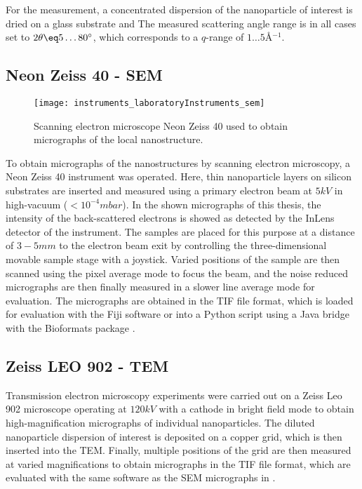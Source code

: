 \documentclass[\main/dresen_thesis.tex]{subfiles}
\begin{document}
    For the measurement, a concentrated dispersion of the nanoparticle of interest is dried on a glass substrate and
    The measured scattering angle range is in all cases set to $2 \theta \eq 5 \ldots 80^\circ$, which corresponds to a $q$-range of $1 \ldots 5 \unit{\angstrom^{-1}}$.


  \subsection{Neon Zeiss 40 - SEM}
    \label{ch:instruments:laboratoryInstruments:sem}
    \begin{figure}[ht]
      \centering
      \texttt{[image: instruments\_laboratoryInstruments\_sem]}
      \caption{\label{fig:appendix:instruments:sem}Scanning electron microscope Neon Zeiss 40 used to obtain micrographs of the local nanostructure.}
    \end{figure}
    To obtain micrographs of the nanostructures by scanning electron microscopy, a Neon Zeiss 40 instrument was operated.
    Here, thin nanoparticle layers on silicon substrates are inserted and measured using a primary electron beam at $5 \unit{kV}$ in high-vacuum ($< 10^{-4} \unit{mbar}$).
    In the shown micrographs of this thesis, the intensity of the back-scattered electrons is showed as detected by the InLens detector of the instrument.
    The samples are placed for this purpose at a distance of $3 - 5 \unit{mm}$ to the electron beam exit by controlling the three-dimensional movable sample stage with a joystick.
    Varied positions of the sample are then scanned using the pixel average mode to focus the beam, and the noise reduced micrographs are then finally measured in a slower line average mode for evaluation.
    The micrographs are obtained in the TIF file format, which is loaded for evaluation with the Fiji software \cite{Schindelin_2012_Fijia} or into a Python script using a Java bridge with the Bioformats package \cite{Linkert_2010_Metad}.

  \subsection{Zeiss LEO 902 - TEM}
    \label{ch:instruments:laboratoryInstruments:tem}
    Transmission electron microscopy experiments were carried out on a Zeiss Leo 902 microscope operating at $120 \unit{kV}$ with a  cathode in bright field mode to obtain high-magnification micrographs of individual nanoparticles.
    The diluted nanoparticle dispersion of interest is deposited on a copper grid, which is then inserted into the TEM.
    Finally, multiple positions of the grid are then measured at varied magnifications to obtain micrographs in the TIF file format, which are evaluated with the same software as the SEM micrographs in .
\end{document}
